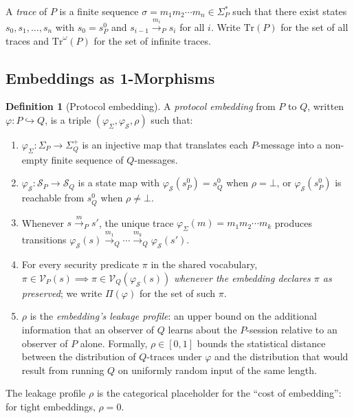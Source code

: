 \documentclass[11pt]{article}
\theoremstyle{definition}
\newtheorem{definition}[theorem]{Definition}
\theoremstyle{remark}
\begin{document}
A \emph{trace} of $P$ is a finite sequence $\sigma = m_1 m_2 \cdots
m_n \in \Sigma_P^*$ such that there exist states $s_0, s_1, \ldots,
s_n$ with $s_0 = s^0_P$ and $s_{i-1} \xrightarrow{m_i}_P s_i$ for all
$i$. Write $\mathrm{Tr}(P)$ for the set of all traces and
$\mathrm{Tr}^\omega(P)$ for the set of infinite traces.

\subsection{Embeddings as 1-Morphisms}

\begin{definition}[Protocol embedding]
\label{def:embedding}
A \emph{protocol embedding} from $P$ to $Q$, written
$\varphi : P \hookrightarrow Q$, is a triple $(\varphi_\Sigma,
\varphi_\mathcal{S}, \rho)$ such that:
\begin{enumerate}
\item $\varphi_\Sigma : \Sigma_P \to \Sigma_Q^+$ is an injective map
that translates each $P$-message into a non-empty finite sequence of
$Q$-messages.
\item $\varphi_\mathcal{S} : \mathcal{S}_P \to \mathcal{S}_Q$ is a
state map with $\varphi_\mathcal{S}(s^0_P) = s^0_Q$ when $\rho =
\bot$, or $\varphi_\mathcal{S}(s^0_P)$ is reachable from $s^0_Q$
when $\rho \neq \bot$.
\item Whenever $s \xrightarrow{m}_P s'$, the unique trace
$\varphi_\Sigma(m) = m_1 m_2 \cdots m_k$ produces transitions
$\varphi_\mathcal{S}(s) \xrightarrow{m_1}_Q \cdots
\xrightarrow{m_k}_Q \varphi_\mathcal{S}(s')$.
\item For every security predicate $\pi$ in the shared vocabulary,
$\pi \in \mathcal{V}_P(s) \implies \pi \in
\mathcal{V}_Q(\varphi_\mathcal{S}(s))$ \emph{whenever the embedding
declares $\pi$ as preserved}; we write $\Pi(\varphi)$ for the set of
such $\pi$.
\item $\rho$ is the \emph{embedding's leakage profile}: an upper bound
on the additional information that an observer of $Q$ learns about
the $P$-session relative to an observer of $P$ alone. Formally,
$\rho \in [0,1]$ bounds the statistical distance between the
distribution of $Q$-traces under $\varphi$ and the distribution that
would result from running $Q$ on uniformly random input of the same
length.
\end{enumerate}
\end{definition}

The leakage profile $\rho$ is the categorical placeholder for the
``cost of embedding'': for tight embeddings, $\rho = 0$.
\end{document}
